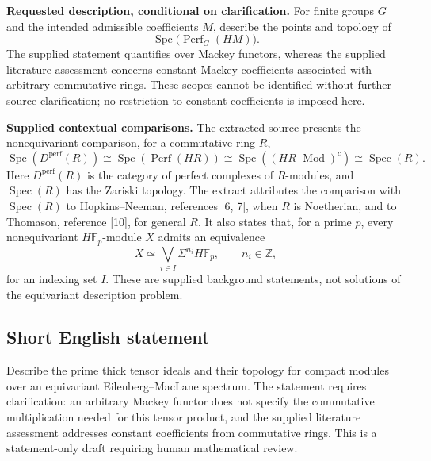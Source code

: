 \documentclass[11pt]{article}
\newcommand{\Z}{\mathbb{Z}}
\newcommand{\F}{\mathbb{F}}
\begin{document}
\textbf{Requested description, conditional on clarification.} For finite groups \(G\) and the intended admissible coefficients \(M\), describe the points and topology of
\[
\operatorname{Spc}\bigl(\operatorname{Perf}_G(HM)\bigr).
\]
The supplied statement quantifies over Mackey functors, whereas the supplied literature assessment concerns constant Mackey coefficients associated with arbitrary commutative rings. These scopes cannot be identified without further source clarification; no restriction to constant coefficients is imposed here.

\textbf{Supplied contextual comparisons.} The extracted source presents the nonequivariant comparison, for a commutative ring \(R\),
\[
\operatorname{Spc}(D^{\mathrm{perf}}(R))
\cong\operatorname{Spc}(\operatorname{Perf}(HR))
\cong\operatorname{Spc}((HR\text{-}\operatorname{Mod})^{c})
\cong\operatorname{Spec}(R).
\]
Here \(D^{\mathrm{perf}}(R)\) is the category of perfect complexes of \(R\)-modules, and \(\operatorname{Spec}(R)\) has the Zariski topology. The extract attributes the comparison with \(\operatorname{Spec}(R)\) to Hopkins--Neeman, references [6, 7], when \(R\) is Noetherian, and to Thomason, reference [10], for general \(R\). It also states that, for a prime \(p\), every nonequivariant \(H\F_p\)-module \(X\) admits an equivalence
\[
X\simeq\bigvee_{i\in I}\Sigma^{n_i}H\F_p,
\qquad n_i\in\Z,
\]
for an indexing set \(I\). These are supplied background statements, not solutions of the equivariant description problem.
\subsection{Short English statement}
Describe the prime thick tensor ideals and their topology for compact modules over an equivariant Eilenberg--MacLane spectrum. The statement requires clarification: an arbitrary Mackey functor does not specify the commutative multiplication needed for this tensor product, and the supplied literature assessment addresses constant coefficients from commutative rings. This is a statement-only draft requiring human mathematical review.
\end{document}
